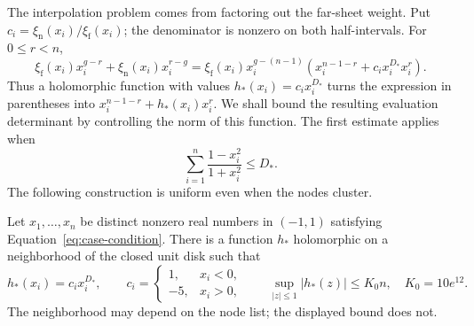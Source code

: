 The interpolation problem comes from factoring out the far-sheet weight.
Put $c_i=\xi_{\mathrm n}(x_i)/\xi_{\mathrm f}(x_i)$; the denominator
is nonzero on both half-intervals. For $0\le r<n$,
\begin{equation}\label{eq:real-sheet-factorization}
 \xi_{\mathrm f}(x_i)x_i^{g-r}
   +\xi_{\mathrm n}(x_i)x_i^{r-g}
 =\xi_{\mathrm f}(x_i)x_i^{g-(n-1)}
   \left(x_i^{n-1-r}+c_i x_i^{D_*}x_i^r\right).
\end{equation}
Thus a holomorphic function with values $h_*(x_i)=c_i x_i^{D_*}$
turns the expression in parentheses into
$x_i^{n-1-r}+h_*(x_i)x_i^r$. We shall bound the resulting evaluation
determinant by controlling the norm of this function. The first estimate
applies when
\begin{equation}\label{eq:case-condition}
 \sum_{i=1}^n\frac{1-x_i^2}{1+x_i^2}\le D_*.
\end{equation}
The following construction is uniform even when the nodes cluster.

\begin{lemma}\label{lem:real-uniform-interpolation}
Let $x_1,\ldots,x_n$ be distinct nonzero real numbers in $(-1,1)$
satisfying Equation~\eqref{eq:case-condition}.  There is a function
$h_*$ holomorphic on a neighborhood of the closed unit disk such that
\[
 h_*(x_i)=c_i x_i^{D_*},\qquad
 c_i=\begin{cases}1,&x_i<0,\\-5,&x_i>0,\end{cases}
 \qquad
 \sup_{|z|\le1}|h_*(z)|\le K_0 n,
 \quad K_0=10e^{12}.
\]
The neighborhood may depend on the node list; the displayed bound does not.
\end{lemma}

